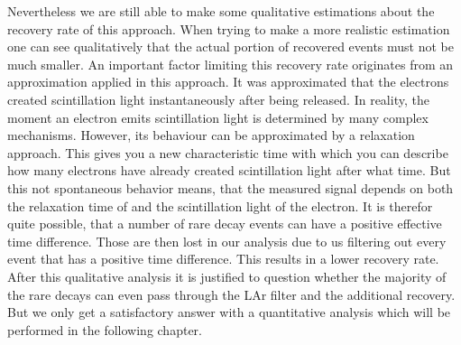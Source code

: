 Nevertheless we are still able to make some qualitative estimations about the recovery rate of this approach. 
When trying to make a more realistic estimation one can see qualitatively that the actual portion of recovered events must not be much smaller.
An important factor limiting this recovery rate originates from an approximation applied in this approach.
It was approximated that the electrons created scintillation light instantaneously after being released.
In reality, the moment an electron emits scintillation light is determined by many complex mechanisms. 
However, its behaviour can be approximated by a relaxation approach. 
This gives you a new characteristic time with which you can describe how many electrons have already created scintillation light after what time. 
But this not spontaneous behavior means, that the measured signal depends on both the relaxation time of  and the scintillation light of the electron.
It is therefor quite possible, that a number of rare  decay events can have a positive effective time difference.
Those are then lost in our analysis due to us filtering out every event that has a positive time difference.
This results in a lower recovery rate.
\\

After this qualitative analysis it is justified to question whether the majority of the rare  decays can even pass through the LAr filter and the additional recovery.
But we only get a satisfactory answer with a quantitative analysis which will be performed in the following chapter.
\\


